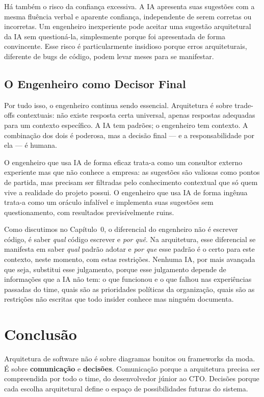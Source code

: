 Há também o risco da confiança excessiva. A IA apresenta suas sugestões com a
mesma fluência verbal e aparente confiança, independente de serem corretas ou
incorretas. Um engenheiro inexperiente pode aceitar uma sugestão arquitetural da
IA sem questioná-la, simplesmente porque foi apresentada de forma convincente.
Esse risco é particularmente insidioso porque erros arquiteturais, diferente de
bugs de código, podem levar meses para se manifestar.

\subsection{O Engenheiro como Decisor Final}

Por tudo isso, o engenheiro continua sendo essencial. Arquitetura é sobre
trade-offs contextuais: não existe resposta certa universal, apenas respostas
adequadas para um contexto específico. A IA tem padrões; o engenheiro tem
contexto. A combinação dos dois é poderosa, mas a decisão final --- e a
responsabilidade por ela --- é humana.

O engenheiro que usa IA de forma eficaz trata-a como um consultor externo
experiente mas que não conhece a empresa: as sugestões são valiosas como
pontos de partida, mas precisam ser filtradas pelo conhecimento contextual
que só quem vive a realidade do projeto possui. O engenheiro que usa IA de
forma ingênua trata-a como um oráculo infalível e implementa suas sugestões
sem questionamento, com resultados previsívelmente ruins.

Como discutimos no Capítulo~0, o diferencial do engenheiro não é escrever
código, é saber \textit{qual} código escrever e \textit{por quê}. Na arquitetura,
esse diferencial se manifesta em saber \textit{qual} padrão adotar e
\textit{por que} esse padrão é o certo para este contexto, neste momento, com
estas restrições. Nenhuma IA, por mais avançada que seja, substitui esse
julgamento, porque esse julgamento depende de informações que a IA não tem:
o que funcionou e o que falhou nas experiências passadas do time, quais são
as prioridades políticas da organização, quais são as restrições não escritas
que todo insider conhece mas ninguém documenta.


\section{Conclusão}

Arquitetura de software não é sobre diagramas bonitos ou frameworks da moda.
É sobre \textbf{comunicação} e \textbf{decisões}. Comunicação porque a
arquitetura precisa ser compreendida por todo o time, do desenvolvedor
júnior ao CTO. Decisões porque cada escolha arquitetural define o espaço de
possibilidades futuras do sistema.

